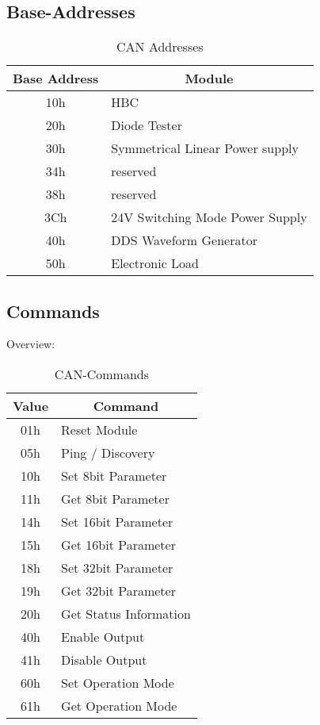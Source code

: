 \subsection{Base-Addresses}
\begin{table}[H]
    \centering
    \begin{tabular}{|c|l|}
        \hline
        \textbf{Base Address}   &   \multicolumn{1}{|c|}{\textbf{Module}}\\ \hline \hline
        10h    &   HBC    \\ \hline
        20h    &   Diode Tester \\ \hline
        30h    &   Symmetrical Linear Power supply \\ \hline
        34h    &   reserved \\ \hline
        38h    &   reserved \\ \hline
        3Ch    &   24V Switching Mode Power Supply \\\hline
        40h    &   DDS Waveform Generator \\ \hline
        50h    &   Electronic Load \\ \hline
    \end{tabular}
    \caption{CAN Addresses}
    \label{tab:CAN-ADD}
\end{table}


\subsection{Commands}
Overview:
\begin{table}[H]
    \centering
    \begin{tabular}{|c|l|}
        \hline
        \textbf{Value}   &   \multicolumn{1}{|c|}{\textbf{Command}}\\ \hline \hline \hline
        01h    &   Reset Module \\ \hline
        05h    &   Ping / Discovery \\ \hline
        \hline
        10h    &   Set 8bit Parameter    \\ \hline
        11h    &   Get 8bit Parameter     \\ \hline
        14h    &   Set 16bit Parameter   \\ \hline
        15h    &   Get 16bit Parameter    \\ \hline 
        18h    &   Set 32bit Parameter  \\ \hline
        19h    &   Get 32bit Parameter  \\ \hline
        \hline
        20h    &   Get Status Information \\ \hline 
        \hline
        40h    &   Enable Output       \\ \hline
        41h    &   Disable Output      \\ \hline 
        \hline
        60h    &   Set Operation Mode  \\ \hline
        61h    &   Get Operation Mode  \\ \hline 
    \end{tabular}
    \caption{CAN-Commands}
\label{tab:CAN-Commands}
\end{table}

